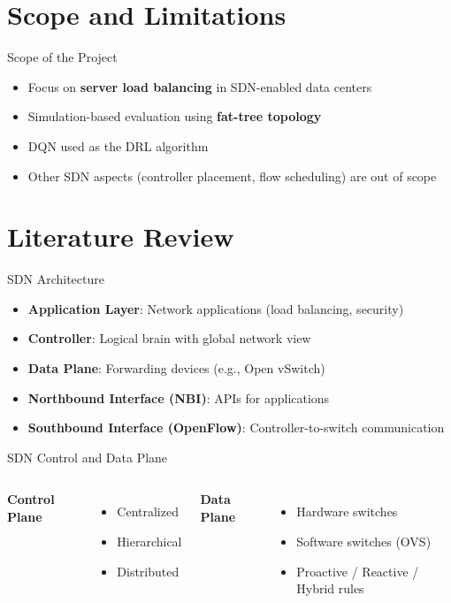 \documentclass[aspectratio=169]{beamer}
\begin{document}
\section{Scope and Limitations}
\begin{frame}{Scope of the Project}
\begin{itemize}
    \item Focus on \textbf{server load balancing} in SDN-enabled data centers
    \item Simulation-based evaluation using \textbf{fat-tree topology}
    \item DQN used as the DRL algorithm
    \item Other SDN aspects (controller placement, flow scheduling) are out of scope
\end{itemize}
\end{frame}


\section{Literature Review}

\begin{frame}{SDN Architecture}
\begin{itemize}
    \item \textbf{Application Layer}: Network applications (load balancing, security)
    \item \textbf{Controller}: Logical brain with global network view
    \item \textbf{Data Plane}: Forwarding devices (e.g., Open vSwitch)
    \item \textbf{Northbound Interface (NBI)}: APIs for applications
    \item \textbf{Southbound Interface (OpenFlow)}: Controller-to-switch communication
\end{itemize}
\end{frame}

\begin{frame}{SDN Control and Data Plane}
\begin{columns}
\textbf{Control Plane}
\begin{itemize}
    \item Centralized
    \item Hierarchical
    \item Distributed
\end{itemize}

\textbf{Data Plane}
\begin{itemize}
    \item Hardware switches
    \item Software switches (OVS)
    \item Proactive / Reactive / Hybrid rules
\end{itemize}
\end{columns}
\end{frame}
\end{document}

